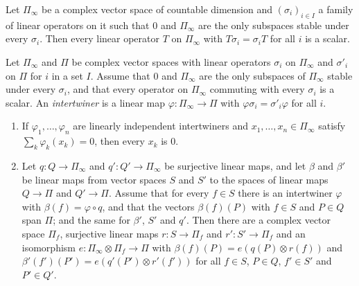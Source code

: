 \begin{lemma}\label{th-first-lift-dixmier}
Let $\Pi_\infty$ be a complex vector space of countable dimension and
$(\sigma_i)_{i\in I}$ a family of linear operators on it such that $0$ and
$\Pi_\infty$ are the only subspaces stable under every $\sigma_i$. Then every
linear operator $T$ on $\Pi_\infty$ with $T\sigma_i=\sigma_iT$ for all $i$ is a
scalar.
\end{lemma}

\begin{lemma}\label{th-first-lift-product}
Let $\Pi_\infty$ and $\Pi$ be complex vector spaces with linear operators
$\sigma_i$ on $\Pi_\infty$ and $\sigma'_i$ on $\Pi$ for $i$ in a set $I$.
Assume that $0$ and $\Pi_\infty$ are the only subspaces of $\Pi_\infty$ stable
under every $\sigma_i$, and that every operator on $\Pi_\infty$ commuting with
every $\sigma_i$ is a scalar. An \emph{intertwiner} is a linear map
$\varphi\colon\Pi_\infty\to\Pi$ with $\varphi\sigma_i=\sigma'_i\varphi$ for
all $i$.
\begin{enumerate}
\item If $\varphi_1,\ldots,\varphi_n$ are linearly independent intertwiners and
  $x_1,\ldots,x_n\in\Pi_\infty$ satisfy $\sum_k\varphi_k(x_k)=0$, then every
  $x_k$ is $0$.
\item Let $q\colon Q\to\Pi_\infty$ and $q'\colon Q'\to\Pi_\infty$ be surjective
  linear maps, and let $\beta$ and $\beta'$ be linear maps from vector spaces
  $S$ and $S'$ to the spaces of linear maps $Q\to\Pi$ and $Q'\to\Pi$. Assume
  that for every $f\in S$ there is an intertwiner $\varphi$ with
  $\beta(f)=\varphi\circ q$, and that the vectors $\beta(f)(P)$ with $f\in S$
  and $P\in Q$ span $\Pi$; and the same for $\beta'$, $S'$ and $q'$. Then there
  are a complex vector space $\Pi_f$, surjective linear maps
  $r\colon S\to\Pi_f$ and $r'\colon S'\to\Pi_f$ and an isomorphism
  $e\colon\Pi_\infty\otimes\Pi_f\to\Pi$ with $\beta(f)(P)=e(q(P)\otimes r(f))$
  and $\beta'(f')(P')=e(q'(P')\otimes r'(f'))$ for all $f\in S$, $P\in Q$,
  $f'\in S'$ and $P'\in Q'$.
\end{enumerate}
\end{lemma}
